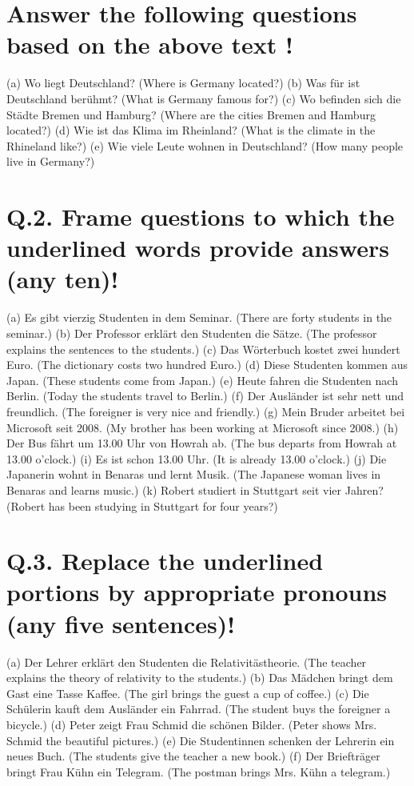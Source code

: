 \documentclass{article}
\begin{document}
\section*{Answer the following questions based on the above text !}
(a) Wo liegt Deutschland? (Where is Germany located?)
(b) Was für ist Deutschland berühmt? (What is Germany famous for?)
(c) Wo befinden sich die Städte Bremen und Hamburg? (Where are the cities Bremen and Hamburg located?)
(d) Wie ist das Klima im Rheinland? (What is the climate in the Rhineland like?)
(e) Wie viele Leute wohnen in Deutschland? (How many people live in Germany?)

\hrulefill

\section*{Q.2. Frame questions to which the underlined words provide answers (any ten)!}
(a) Es gibt vierzig Studenten in dem Seminar. (There are forty students in the seminar.)
(b) Der Professor erklärt den Studenten die Sätze. (The professor explains the sentences to the students.)
(c) Das Wörterbuch kostet zwei hundert Euro. (The dictionary costs two hundred Euro.)
(d) Diese Studenten kommen aus Japan. (These students come from Japan.)
(e) Heute fahren die Studenten nach Berlin. (Today the students travel to Berlin.)
(f) Der Ausländer ist sehr nett und freundlich. (The foreigner is very nice and friendly.)
(g) Mein Bruder arbeitet bei Microsoft seit 2008. (My brother has been working at Microsoft since 2008.)
(h) Der Bus fährt um 13.00 Uhr von Howrah ab. (The bus departs from Howrah at 13.00 o'clock.)
(i) Es ist schon 13.00 Uhr. (It is already 13.00 o'clock.)
(j) Die Japanerin wohnt in Benaras und lernt Musik. (The Japanese woman lives in Benaras and learns music.)
(k) Robert studiert in Stuttgart seit vier Jahren? (Robert has been studying in Stuttgart for four years?)

\section*{Q.3. Replace the underlined portions by appropriate pronouns (any five sentences)!}
(a) Der Lehrer erklärt den Studenten die Relativitästheorie. (The teacher explains the theory of relativity to the students.)
(b) Das Mädchen bringt dem Gast eine Tasse Kaffee. (The girl brings the guest a cup of coffee.)
(c) Die Schülerin kauft dem Ausländer ein Fahrrad. (The student buys the foreigner a bicycle.)
(d) Peter zeigt Frau Schmid die schönen Bilder. (Peter shows Mrs. Schmid the beautiful pictures.)
(e) Die Studentinnen schenken der Lehrerin ein neues Buch. (The students give the teacher a new book.)
(f) Der Briefträger bringt Frau Kühn ein Telegram. (The postman brings Mrs. Kühn a telegram.)
\end{document}
